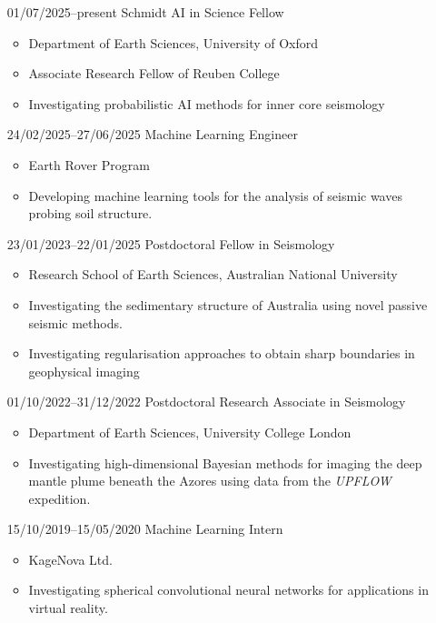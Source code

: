 \begin{itemize}
    \item[01/07/2025--present] Schmidt AI in Science Fellow
        \begin{itemize}
            \item Department of Earth Sciences, University of Oxford
            \item Associate Research Fellow of Reuben College
            \item Investigating probabilistic AI methods for inner core seismology
        \end{itemize}
    \item[24/02/2025--27/06/2025] Machine Learning Engineer
        \begin{itemize}
            \item Earth Rover Program
            \item Developing machine learning tools for the analysis of seismic waves probing soil structure.
        \end{itemize}
    \item[23/01/2023--22/01/2025] Postdoctoral Fellow in Seismology
        \begin{itemize}
            \item Research School of Earth Sciences, Australian National University
            \item Investigating the sedimentary structure of Australia using novel passive seismic methods.
            \item Investigating regularisation approaches to obtain sharp boundaries in geophysical imaging
        \end{itemize}
    \item[01/10/2022--31/12/2022] Postdoctoral Research Associate in Seismology
        \begin{itemize}
            \item Department of Earth Sciences, University College London
            \item Investigating high-dimensional Bayesian methods for imaging the deep mantle plume beneath the Azores using data from the \textit{UPFLOW} expedition.
        \end{itemize}
    \item[15/10/2019--15/05/2020] Machine Learning Intern
        \begin{itemize}
            \item KageNova Ltd.
            \item Investigating spherical convolutional neural networks for applications in virtual reality.
        \end{itemize}
\end{itemize}

